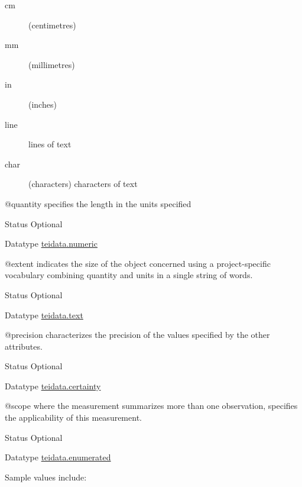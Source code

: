 \begin{reflist}
\begin{sansreflist}
\begin{reflist}
\begin{description}
\item[{cm}](centimetres)
\item[{mm}](millimetres)
\item[{in}](inches)
\item[{line}]lines of text
\item[{char}](characters) characters of text
\end{description} 
\end{reflist}  
    \item[@quantity]
  specifies the length in the units specified
\begin{reflist}
    \item[{Status}]
  Optional
    \item[{Datatype}]
  \hyperref[TEI.teidata.numeric]{teidata.numeric}
\end{reflist}  
    \item[@extent]
  indicates the size of the object concerned using a project-specific vocabulary combining quantity and units in a single string of words.
\begin{reflist}
    \item[{Status}]
  Optional
    \item[{Datatype}]
  \hyperref[TEI.teidata.text]{teidata.text}
    \item[]
    \item[]
\end{reflist}  
    \item[@precision]
  characterizes the precision of the values specified by the other attributes.
\begin{reflist}
    \item[{Status}]
  Optional
    \item[{Datatype}]
  \hyperref[TEI.teidata.certainty]{teidata.certainty}
\end{reflist}  
    \item[@scope]
  where the measurement summarizes more than one observation, specifies the applicability of this measurement.
\begin{reflist}
    \item[{Status}]
  Optional
    \item[{Datatype}]
  \hyperref[TEI.teidata.enumerated]{teidata.enumerated}
    \item[{Sample values include:}]
  \begin{description}


\end{description}
\end{reflist}
\end{sansreflist}
\end{reflist}
